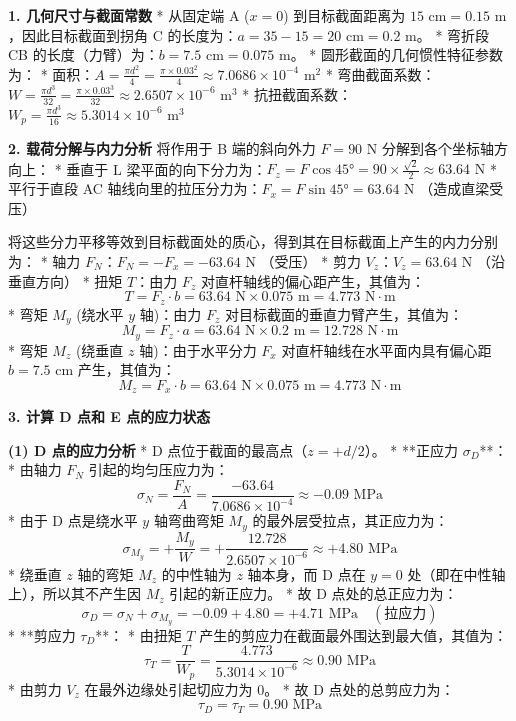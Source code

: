 \documentclass[UTF8,fontset=windows]{ctexart}
\begin{document}
\textbf{1. 几何尺寸与截面常数}
*   从固定端 A ($x = 0$) 到目标截面距离为 $15\text{ cm} = 0.15\text{ m}$，因此目标截面到拐角 C 的长度为：$a = 35 - 15 = 20\text{ cm} = 0.2\text{ m}$。
*   弯折段 CB 的长度（力臂）为：$b = 7.5\text{ cm} = 0.075\text{ m}$。
*   圆形截面的几何惯性特征参数为：
    *   面积：$A = \frac{\pi d^2}{4} = \frac{\pi \times 0.03^2}{4} \approx 7.0686 \times 10^{-4}\text{ m}^2$
    *   弯曲截面系数：$W = \frac{\pi d^3}{32} = \frac{\pi \times 0.03^3}{32} \approx 2.6507 \times 10^{-6}\text{ m}^3$
    *   抗扭截面系数：$W_p = \frac{\pi d^3}{16} \approx 5.3014 \times 10^{-6}\text{ m}^3$

\textbf{2. 载荷分解与内力分析}
将作用于 B 端的斜向外力 $F = 90\text{ N}$ 分解到各个坐标轴方向上：
*   垂直于 L 梁平面的向下分力为：$F_z = F \cos 45\text{°} = 90 \times \frac{\sqrt{2}}{2} \approx 63.64\text{ N}$
*   平行于直段 AC 轴线向里的拉压分力为：$F_x = F \sin 45\text{°} = 63.64\text{ N}$ （造成直梁受压）

将这些分力平移等效到目标截面处的质心，得到其在目标截面上产生的内力分别为：
*   轴力 $F_N$：$F_N = -F_x = -63.64\text{ N}$ （受压）
*   剪力 $V_z$：$V_z = 63.64\text{ N}$ （沿垂直方向）
*   扭矩 $T$：由力 $F_z$ 对直杆轴线的偏心距产生，其值为：
    \[
        T = F_z \cdot b = 63.64\text{ N} \times 0.075\text{ m} = 4.773\text{ N}\cdot\text{m}
    \]
*   弯矩 $M_y$ (绕水平 $y$ 轴)：由力 $F_z$ 对目标截面的垂直力臂产生，其值为：
    \[
        M_y = F_z \cdot a = 63.64\text{ N} \times 0.2\text{ m} = 12.728\text{ N}\cdot\text{m}
    \]
*   弯矩 $M_z$ (绕垂直 $z$ 轴)：由于水平分力 $F_x$ 对直杆轴线在水平面内具有偏心距 $b = 7.5\text{ cm}$ 产生，其值为：
    \[
        M_z = F_x \cdot b = 63.64\text{ N} \times 0.075\text{ m} = 4.773\text{ N}\cdot\text{m}
    \]

\textbf{3. 计算 D 点和 E 点的应力状态}

\textbf{(1) D 点的应力分析}
*   D 点位于截面的最高点（$z = +d/2$）。
*   **正应力 $\sigma_D$**：
    *   由轴力 $F_N$ 引起的均匀压应力为：
        \[
            \sigma_N = \frac{F_N}{A} = \frac{-63.64}{7.0686 \times 10^{-4}} \approx -0.09\text{ MPa}
        \]
    *   由于 D 点是绕水平 $y$ 轴弯曲弯矩 $M_y$ 的最外层受拉点，其正应力为：
        \[
            \sigma_{M_y} = +\frac{M_y}{W} = +\frac{12.728}{2.6507 \times 10^{-6}} \approx +4.80\text{ MPa}
        \]
    *   绕垂直 $z$ 轴的弯矩 $M_z$ 的中性轴为 $z$ 轴本身，而 D 点在 $y=0$ 处（即在中性轴上），所以其不产生因 $M_z$ 引起的新正应力。
    *   故 D 点处的总正应力为：
        \[
            \sigma_D = \sigma_N + \sigma_{M_y} = -0.09 + 4.80 = +4.71\text{ MPa} \quad (\text{拉应力})
        \]
*   **剪应力 $\tau_D$**：
    *   由扭矩 $T$ 产生的剪应力在截面最外围达到最大值，其值为：
        \[
            \tau_T = \frac{T}{W_p} = \frac{4.773}{5.3014 \times 10^{-6}} \approx 0.90\text{ MPa}
        \]
    *   由剪力 $V_z$ 在最外边缘处引起切应力为 0。
    *   故 D 点处的总剪应力为：
        \[
            \tau_D = \tau_T = 0.90\text{ MPa}
        \]
\end{document}
